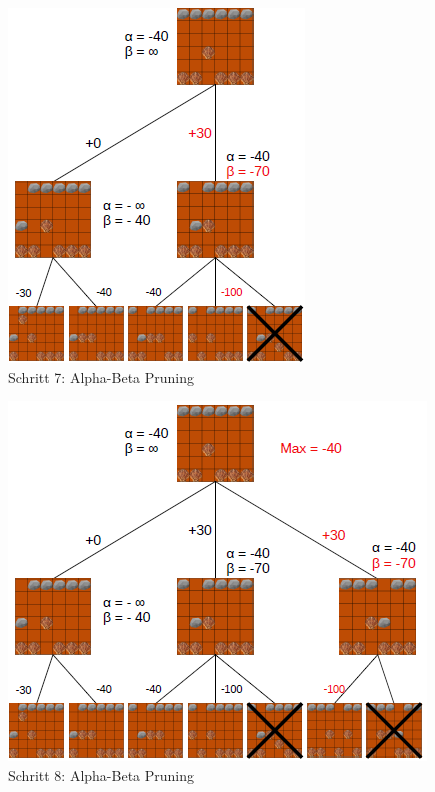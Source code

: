 \begin{figure}[h]
	\centering
	\includegraphics{img/ab7}
	\caption{Schritt 7: Alpha-Beta Pruning}
	\label{fig:ab7}
\end{figure}
\begin{figure}[h]
	\centering
	\includegraphics{img/ab8}
	\caption{Schritt 8: Alpha-Beta Pruning}
	\label{fig:ab8}
\end{figure}



